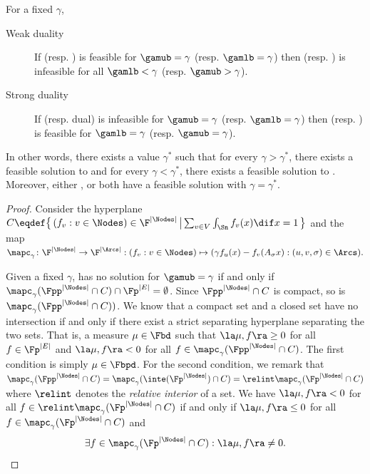 \documentclass[11pt,twoside,a4paper,openright]{uclouvain-thesis}
\begin{document}
\begin{mylem}
  \label{lem:duality}
  For a fixed $\gamma$,
  \begin{description}
    \item[Weak duality] If  (resp. ) is feasible for $\gamub = \gamma$ (resp. $\gamlb = \gamma$) then  (resp. ) is infeasible for all $\gamlb < \gamma$ (resp. $\gamub > \gamma$).
    \item[Strong duality] If  (resp. dual) is infeasible for $\gamub = \gamma$ (resp. $\gamlb = \gamma$) then  (resp. ) is feasible for $\gamlb = \gamma$ (resp. $\gamub = \gamma$).
  \end{description}

  In other words, there exists a value $\gamma^*$ such that
  for every $\gamma > \gamma^*$, there exists a feasible solution to  and
  for every $\gamma < \gamma^*$, there exists a feasible solution to .
  Moreover, either ,  or both have a feasible solution with $\gamma = \gamma^*$.
  \begin{proof}
    Consider the hyperplane
    \( C \eqdef \big\{\, (f_v : v \in \Nodes) \in \F^{|\Nodes|} \, \big| \sum_{v \in V} \int_{\Sn} f_v(x) \dif x \\= 1 \,\big\} \)
    and the map
    \( \mapc_\gamma \colon \F^{|\Nodes|} \to \F^{|\Arcs|} : (f_v : v \in \Nodes) \mapsto (\gamma f_u(x) - f_v(A_\sigma x) : (u,v,\sigma) \in \Arcs). \)

    Given a fixed $\gamma$,
     has no solution for $\gamub = \gamma$
    if and only if $\mapc_{\gamma}(\Fpp^{|\Nodes|} \cap C) \cap \Fp^{|E|} = \emptyset$.
    Since $\Fpp^{|\Nodes|} \cap C$ is compact, so is $\mapc_{\gamma}(\Fpp^{|\Nodes|} \cap C))$.
    We know that a compact set and a closed set have no intersection if and only if there exist a strict separating hyperplane separating the two sets.
    That is, a measure $\mu \in \Fbd$ such that $\la \mu, f \ra \geq 0$ for all $f \in \Fp^{|E|}$ and $\la \mu, f \ra < 0$ for all $f \in \mapc_{\gamma}(\Fpp^{|\Nodes|} \cap C)$.
    The first condition is simply $\mu \in \Fbpd$.
    For the second condition, we remark that
    \( \mapc_{\gamma}(\Fpp^{|\Nodes|} \cap C) = \mapc_{\gamma}(\inte(\Fp^{|\Nodes|}) \cap C) = \relint\mapc_{\gamma}(\Fp^{|\Nodes|} \cap C) \)
    where $\relint$ denotes the \emph{relative interior} of a set.
    We have $\la \mu, f \ra < 0$ for all $f \in \relint\mapc_{\gamma}(\Fp^{|\Nodes|} \cap C)$ if and only if
    $\la \mu, f \ra \leq 0$ for all $f \in \mapc_{\gamma}(\Fp^{|\Nodes|} \cap C)$ and
    \begin{equation}
      \label{eq:affinhyp}
      \exists f \in \mapc_{\gamma}(\Fp^{|\Nodes|} \cap C) : \la \mu, f \ra \neq 0.
    \end{equation}


\end{proof}
\end{mylem}
\end{document}
